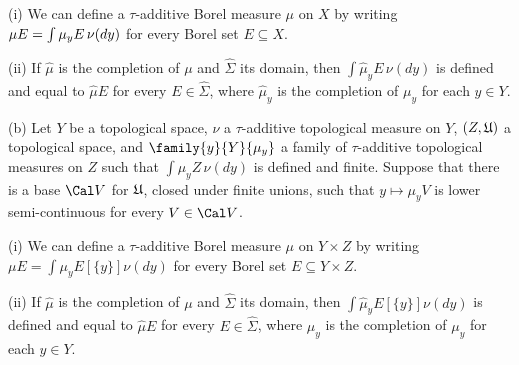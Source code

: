 \quad(i) We can define a $\tau$-additive Borel measure
$\mu$ on $X$ by writing
$\mu E\penalty-100=\penalty-100\int\mu_yE\,\nu(dy)$ for every Borel set
$E\subseteq X$.

\quad(ii) If $\hat\mu$ is the completion of $\mu$ and $\hat\Sigma$ its
domain, then $\int\hat\mu_yE\,\nu(dy)$ is defined and equal to
$\hat\mu E$ for every $E\in\hat\Sigma$,
where $\hat\mu_y$ is the completion of $\mu_y$ for each $y\in Y$.

(b) Let $Y$ be a topological space, $\nu$ a $\tau$-additive topological
measure on $Y$, $(Z,\frak U)$ a topological space, and
$\family{y}{Y}{\mu_y}$
a family of $\tau$-additive topological measures on $Z$ such that
$\int\mu_yZ\,\nu(dy)$ is defined and finite.
Suppose that there is a base $\Cal V$ for $\frak U$, closed under finite
unions, such
that $y\mapsto\mu_yV$ is lower semi-continuous for every $V\in\Cal V$.

\quad(i) We can define a $\tau$-additive Borel measure $\mu$ on
$Y\times Z$ by writing $\mu E=\int\mu_yE[\{y\}]\nu(dy)$ for
every Borel set $E\subseteq Y\times Z$.

\quad(ii) If $\hat\mu$ is the completion of $\mu$ and $\hat\Sigma$ its
domain, then $\int\hat\mu_yE[\{y\}]\nu(dy)$ is defined and equal to
$\hat\mu E$ for every $E\in\hat\Sigma$,
where $\hat\mu_y$ is the completion of $\mu_y$ for each $y\in Y$.

